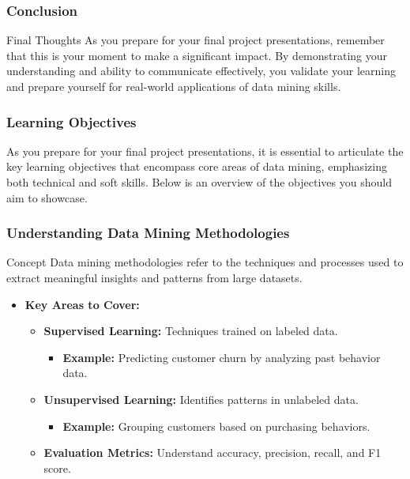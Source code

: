 \documentclass[aspectratio=169]{beamer}
\begin{document}
\begin{frame}[fragile]
    \frametitle{Conclusion}
    \begin{block}{Final Thoughts}
        As you prepare for your final project presentations, remember that this is your moment to make a significant impact. By demonstrating your understanding and ability to communicate effectively, you validate your learning and prepare yourself for real-world applications of data mining skills.
    \end{block}
\end{frame}

\begin{frame}[fragile]
    \frametitle{Learning Objectives}
    As you prepare for your final project presentations, it is essential to articulate the key learning objectives that encompass core areas of data mining, emphasizing both technical and soft skills. Below is an overview of the objectives you should aim to showcase.
\end{frame}

\begin{frame}[fragile]
    \frametitle{Understanding Data Mining Methodologies}
    \begin{block}{Concept}
        Data mining methodologies refer to the techniques and processes used to extract meaningful insights and patterns from large datasets.
    \end{block}

    \begin{itemize}
      \item \textbf{Key Areas to Cover:}
      \begin{itemize}
        \item \textbf{Supervised Learning:} Techniques trained on labeled data.
        \begin{itemize}
            \item \textbf{Example:} Predicting customer churn by analyzing past behavior data.
        \end{itemize}
        \item \textbf{Unsupervised Learning:} Identifies patterns in unlabeled data.
        \begin{itemize}
            \item \textbf{Example:} Grouping customers based on purchasing behaviors.
        \end{itemize}
        \item \textbf{Evaluation Metrics:} Understand accuracy, precision, recall, and F1 score.
      \end{itemize}
    \end{itemize}
\end{frame}
\end{document}
